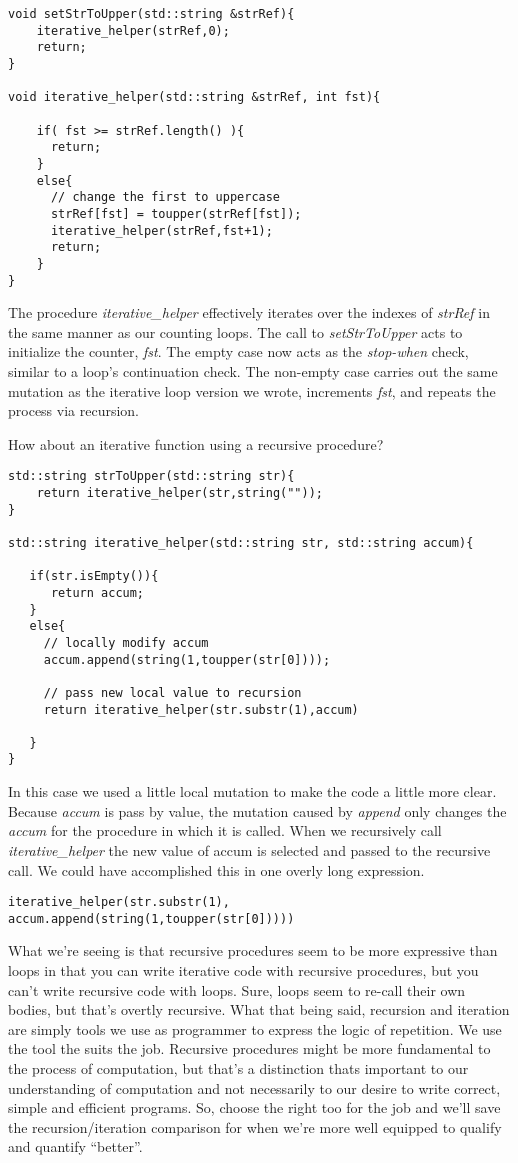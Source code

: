 \documentclass[]{tufte-handout}
\begin{document}
\begin{verbatim}
void setStrToUpper(std::string &strRef){
 	iterative_helper(strRef,0);
 	return;
}

void iterative_helper(std::string &strRef, int fst){

 	if( fst >= strRef.length() ){
 	  return;
 	}
 	else{
      // change the first to uppercase
 	  strRef[fst] = toupper(strRef[fst]);
	  iterative_helper(strRef,fst+1);
 	  return; 
 	}
}
\end{verbatim} 

The procedure \textit{iterative\_helper} effectively iterates over the indexes of \textit{strRef} in the same manner as our counting loops. The call to \textit{setStrToUpper} acts to initialize the counter, \textit{fst}. The empty case now acts as the \textit{stop-when} check, similar to a loop's continuation check.  The non-empty case carries out the same mutation as the iterative loop version we wrote, increments \textit{fst}, and repeats the process via recursion. 

How about an iterative function using a recursive procedure?
\begin{verbatim}
std::string strToUpper(std::string str){
	return iterative_helper(str,string(""));
}

std::string iterative_helper(std::string str, std::string accum){

   if(str.isEmpty()){
      return accum;
   }
   else{
	 // locally modify accum     
     accum.append(string(1,toupper(str[0])));
	 
	 // pass new local value to recursion
	 return iterative_helper(str.substr(1),accum)   
   
   }
}
\end{verbatim}
In this case we used a little local mutation to make the code a little more clear.  Because \textit{accum} is pass by value, the mutation caused by \textit{append} only changes the \textit{accum} for the procedure in which it is called. When we recursively call \textit{iterative\_helper} the new value of accum is selected and passed to the recursive call. We could have accomplished this in one overly long expression.
\begin{verbatim}
iterative_helper(str.substr(1), accum.append(string(1,toupper(str[0]))))   
\end{verbatim} 

What we're seeing is that recursive procedures seem to be more expressive than loops in that you can write iterative code with recursive procedures, but you can't write recursive code with loops.  Sure, loops seem to re-call their own bodies, but that's overtly recursive.  What that being said, recursion and iteration are simply tools we use as programmer to express the logic of repetition.  We use the tool the suits the job. Recursive procedures might be more fundamental to the process of computation, but that's a distinction thats important to our understanding of computation and not necessarily to our desire to write correct, simple and efficient programs. So, choose the right too for the job and we'll save the recursion/iteration comparison for when we're more well equipped to qualify and quantify ``better''.
\end{document}
